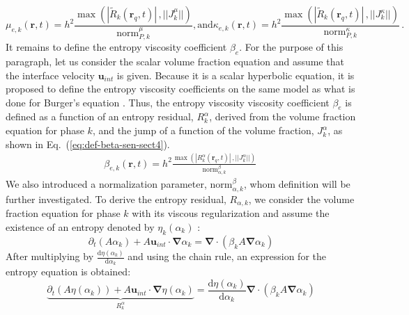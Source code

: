\documentclass[preprint,10pt]{elsarticle}
\renewcommand{\div}{\mbold{\nabla}\! \cdot \!}
\newcommand{\grad}{\mbold{\nabla}}
\newcommand{\mbold}[1]{\boldsymbol#1}
\newcommand{\norm}{\textrm{norm}}
\newcommand{\resi}{R}
\newcommand{\resinew}{\widetilde{\resi}}
\newcommand{\eqt}[1]{Eq.~(\ref{#1})}                     %
\begin{document}
%
\begin{subequations}\label{eq:visc_definition-sct4}
\begin{equation}
\mu_{e,k}(\mbold r,t)    = h^2 \frac{\max\left( | \resinew_k(\mbold r_q,t) |\,, || J_k^\mu || \right)}{\norm_{P,k}^\mu},
\end{equation} 
\text{and} 
\begin{equation}
\kappa_{e,k}(\mbold r,t) = h^2 \frac{\max\left( | \resinew_k(\mbold r_q,t) |\,, || J_k^\kappa || \right)}{\norm_{P,k}^\kappa} \, .
\end{equation}
\end{subequations}
%
It remains to define the entropy viscosity coefficient $\beta_e$. For the purpose of this paragraph, let us consider the scalar volume fraction equation and assume that the interface velocity $\mbold u_{int}$ is given. Because it is a scalar hyperbolic equation, it is proposed to define the entropy viscosity coefficients on the same model as what is done for Burger's equation \cite{jlg1, jlg2}. Thus, the entropy viscosity viscosity coefficient $\beta_e$ is defined as a function of an entropy residual, $R_{k}^\alpha$, derived from the volume fraction equation for phase $k$, and the jump of a function of the volume fraction, $J_k^\alpha$, as shown in \eqt{eq:def-beta-sen-sect4}.
%
\begin{align}\label{eq:def-beta-sen-sect4}
\beta_{e,k}( \mbold r, t) = h^2 \frac{\max\left( | R_{k}^\alpha(\mbold r_q,t) |\,, || J_k^\alpha|| \right)}{\norm_{\alpha, k}^\beta} \,
\end{align}
%
We also introduced a normalization parameter, $\norm_{\alpha,k}^\beta$, whom definition will be further investigated. To derive the entropy residual, $R_{\alpha,k}$, we consider the volume fraction equation for phase $k$ with its viscous regularization and assume the existence of an entropy denoted by $\eta_k(\alpha_k)$ \cite{Leveque}:
%
\begin{equation}\label{eq:vf-sem-sct4}
\partial_t \left(A \alpha_k \right) + A \mbold u_{int} \cdot \grad \alpha_k = \div \left( \beta_k A \grad \alpha_k \right)
\end{equation}
% 
After multiplying by $\frac{\text{d} \eta (\alpha_k)}{\text{d} \alpha_k}$ and using the chain rule, an expression for the entropy equation is obtained:
%
\begin{equation}\label{eq:vf-sem2-sct4}
\underbrace{\partial_t \left(A \eta(\alpha_k) \right) + A \mbold u_{int} \cdot \grad \eta(\alpha_k)}_{R_{k}^\alpha} = \frac{\text{d} \eta (\alpha_k)}{\text{d} \alpha_k} \div \left( \beta_k A \grad \alpha_k \right)
\end{equation}
\end{document}
